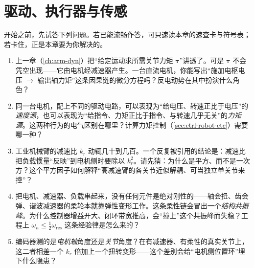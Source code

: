 \chapter{驱动、执行器与传感}
\label{ch:drive-systems}


\begin{practice}[前置自测]
开始之前，先试答下列问题。若已能流畅作答，可只速读本章的速查卡与符号表；若卡住，正是本章要为你解决的。
\begin{enumerate}
  \item 上一章（\cref{ch:arm-dyn}）把“给定运动求所需关节力矩 $\boldsymbol{\tau}$”讲透了。可是 $\boldsymbol{\tau}$ 不会凭空出现——它由电机经减速器产生。一台直流电机，你能写出“施加电枢电压 $\to$ 输出轴力矩”这条因果链的微分方程吗？反电动势在其中扮演什么角色？
  \item 同一台电机，配上不同的驱动电路，可以表现为“给电压、转速正比于电压”的\emph{速度源}，也可以表现为“给指令、力矩正比于指令、与转速几乎无关”的\emph{力矩源}。这两种行为的电气区别在哪里？计算力矩控制（\cref{sec:ctrl-robot-ctc}）需要哪一种？
  \item 工业机械臂的减速比 $k_r$ 动辄几十到几百。一个反复被引用的结论是：减速比把负载惯量“反映”到电机侧时要除以 $k_r^2$。请先猜：为什么是平方、而不是一次方？这个平方因子如何解释“高减速臂的各关节近似解耦、可当独立单关节来控”？
  \item 把电机、减速器、负载串起来，没有任何元件是绝对刚性的——轴会扭、齿会弹、谐波减速器的柔轮本就靠弹性变形工作。这条柔性链会冒出一个\emph{结构共振峰}。为什么控制器增益开大、闭环带宽推高，会“撞上”这个共振峰而失稳？工程上 $\omega_n\le\tfrac12\omega_{\mathrm{res}}$ 这条经验律是怎么来的？
  \item 编码器测的是\emph{电机轴}角度还是\emph{关节}角度？在有减速器、有柔性的真实关节上，这二者相差一个 $k_r$ 倍加上一个扭转变形——这个差别会给“电机侧位置环”埋下什么隐患？
\end{enumerate}
\end{practice}

